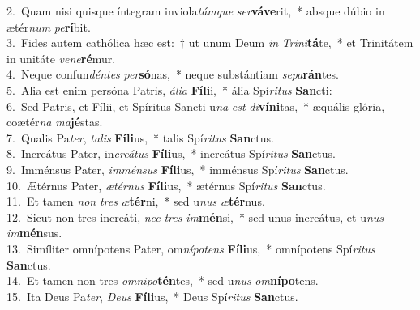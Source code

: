 {2.~}Quam nisi quisque íntegram inviola\textit{tám}\textit{que} \textit{ser}\textbf{vá}\textbf{ve}rit,~* absque dúbio in ætér\textit{num} \textit{pe}\textbf{rí}bit.\\
{3.~}Fides autem cathólica hæc est:~† ut unum Deum \textit{in} \textit{Tri}\textit{ni}\textbf{tá}te,~* et Trinitátem in unitáte \textit{ve}\textit{ne}\textbf{ré}mur.\\
{4.~}Neque confun\textit{dén}\textit{tes} \textit{per}\textbf{só}nas,~* neque substántiam \textit{se}\textit{pa}\textbf{rán}tes.\\
{5.~}Alia est enim persóna Patris, \textit{á}\textit{li}\textit{a} \textbf{Fí}\textbf{li}i,~* ália Spí\textit{ri}\textit{tus} \textbf{San}cti:\\
{6.~}Sed Patris, et Fílii, et Spíritus Sancti u\textit{na} \textit{est} \textit{di}\textbf{ví}\textbf{ni}tas,~* æquális glória, coætér\textit{na} \textit{ma}\textbf{jé}stas.\\
{7.~}Qualis Pa\textit{ter}, \textit{ta}\textit{lis} \textbf{Fí}\textbf{li}us,~* talis Spí\textit{ri}\textit{tus} \textbf{San}ctus.\\
{8.~}Increátus Pater, in\textit{cre}\textit{á}\textit{tus} \textbf{Fí}\textbf{li}us,~* increátus Spí\textit{ri}\textit{tus} \textbf{San}ctus.\\
{9.~}Imménsus Pater, \textit{im}\textit{mén}\textit{sus} \textbf{Fí}\textbf{li}us,~* imménsus Spí\textit{ri}\textit{tus} \textbf{San}ctus.\\
{10.~}Ætérnus Pater, \textit{æ}\textit{tér}\textit{nus} \textbf{Fí}\textbf{li}us,~* ætérnus Spí\textit{ri}\textit{tus} \textbf{San}ctus.\\
{11.~}Et tamen \textit{non} \textit{tres} \textit{æ}\textbf{tér}ni,~* sed u\textit{nus} \textit{æ}\textbf{tér}nus.\\
{12.~}Sicut non tres increáti, \textit{nec} \textit{tres} \textit{im}\textbf{mén}si,~* sed unus increátus, et u\textit{nus} \textit{im}\textbf{mén}sus.\\
{13.~}Simíliter omnípotens Pater, om\textit{ní}\textit{po}\textit{tens} \textbf{Fí}\textbf{li}us,~* omnípotens Spí\textit{ri}\textit{tus} \textbf{San}ctus.\\
{14.~}Et tamen non tres \textit{om}\textit{ni}\textit{po}\textbf{tén}tes,~* sed u\textit{nus} \textit{om}\textbf{ní}\textbf{po}tens.\\
{15.~}Ita Deus Pa\textit{ter}, \textit{De}\textit{us} \textbf{Fí}\textbf{li}us,~* Deus Spí\textit{ri}\textit{tus} \textbf{San}ctus.\\
